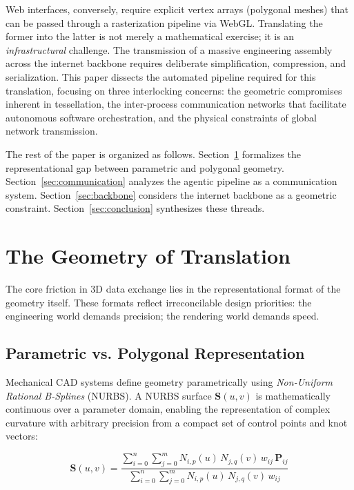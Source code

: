 \documentclass[conference]{IEEEtran}
\begin{document}
Web interfaces, conversely, require explicit vertex arrays (polygonal meshes) that can be passed through a rasterization pipeline via WebGL. Translating the former into the latter is not merely a mathematical exercise; it is an \textit{infrastructural} challenge. The transmission of a massive engineering assembly across the internet backbone requires deliberate simplification, compression, and serialization. This paper dissects the automated pipeline required for this translation, focusing on three interlocking concerns: the geometric compromises inherent in tessellation, the inter-process communication networks that facilitate autonomous software orchestration, and the physical constraints of global network transmission.

The rest of the paper is organized as follows. Section~\ref{sec:geometry} formalizes the representational gap between parametric and polygonal geometry. Section~\ref{sec:communication} analyzes the agentic pipeline as a communication system. Section~\ref{sec:backbone} considers the internet backbone as a geometric constraint. Section~\ref{sec:conclusion} synthesizes these threads.

\section{The Geometry of Translation}
\label{sec:geometry}

The core friction in 3D data exchange lies in the representational format of the geometry itself. These formats reflect irreconcilable design priorities: the engineering world demands precision; the rendering world demands speed.

\subsection{Parametric vs. Polygonal Representation}

Mechanical CAD systems define geometry parametrically using \textit{Non-Uniform Rational B-Splines} (NURBS). A NURBS surface $\mathbf{S}(u,v)$ is mathematically continuous over a parameter domain, enabling the representation of complex curvature with arbitrary precision from a compact set of control points and knot vectors:

\begin{equation}
    \mathbf{S}(u,v) = \frac{\sum_{i=0}^{n}\sum_{j=0}^{m} N_{i,p}(u)\, N_{j,q}(v)\, w_{ij}\, \mathbf{P}_{ij}}{\sum_{i=0}^{n}\sum_{j=0}^{m} N_{i,p}(u)\, N_{j,q}(v)\, w_{ij}}
\end{equation}
\end{document}
